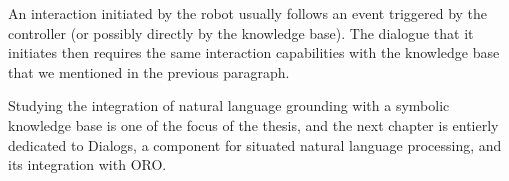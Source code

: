 An interaction initiated by the robot usually follows an event triggered by the
controller (or possibly directly by the knowledge base). The dialogue that it
initiates then requires the same interaction capabilities with the knowledge
base that we mentioned in the previous paragraph.

Studying the integration of natural language grounding with a symbolic
knowledge base is one of the focus of the thesis, and the next chapter is
entierly dedicated to {\sc Dialogs}, a component for situated natural language
processing, and its integration with ORO.


